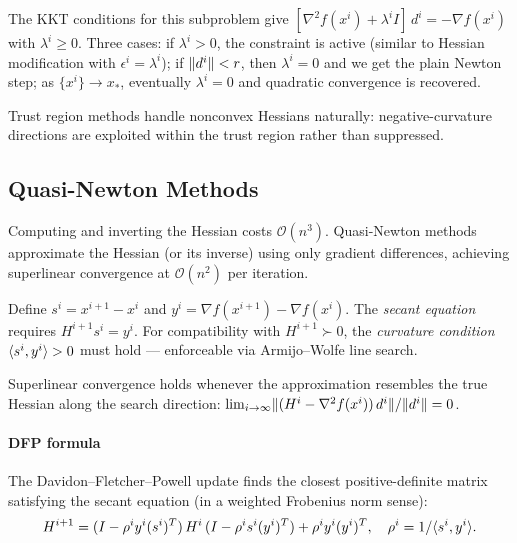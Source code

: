 The KKT conditions for this subproblem give $[\nabla^2 f(x^i) + \lambda^i I]\, d^i = -\nabla f(x^i)$ with $\lambda^i \geq 0$.
Three cases: if $\lambda^i > 0$, the constraint is active (similar to Hessian modification with $\epsilon^i = \lambda^i$); if $\lVert d^i\rVert < r$, then $\lambda^i = 0$ and we get the plain Newton step; as $\{x^i\} \to x_*$, eventually $\lambda^i = 0$ and quadratic convergence is recovered.

Trust region methods handle nonconvex Hessians naturally: negative-curvature directions are exploited within the trust region rather than suppressed.


\subsection{Quasi-Newton Methods}\label{ssec:quasi-newton}

Computing and inverting the Hessian costs $\mathcal{O}(n^3)$.
Quasi-Newton methods approximate the Hessian (or its inverse) using only gradient differences, achieving superlinear convergence at $\mathcal{O}(n^2)$ per iteration.

\begin{defn}\label{def:secant}
	Define $s^i = x^{i+1} - x^i$ and $y^i = \nabla f(x^{i+1}) - \nabla f(x^i)$.
	The \textit{secant equation} requires $H^{i+1} s^i = y^i$.
	For compatibility with $H^{i+1} \succ 0$, the \textit{curvature condition} $\langle s^i, y^i\rangle > 0$ must hold --- enforceable via Armijo--Wolfe line search.
\end{defn}

Superlinear convergence holds whenever the approximation resembles the true Hessian along the search direction: $\lim_{i \to \infty} \lVert(H^i - \nabla^2 f(x^i))\, d^i\rVert / \lVert d^i\rVert = 0$.

\paragraph{DFP formula}

The Davidon--Fletcher--Powell update finds the closest positive-definite matrix satisfying the secant equation (in a weighted Frobenius norm sense):
\begin{equation}\label{eq:dfp-update}
	H^{i+1} = (I - \rho^i y^i (s^i)^T)\, H^i\, (I - \rho^i s^i (y^i)^T) + \rho^i y^i (y^i)^T,
	\quad \rho^i = 1/\langle s^i, y^i\rangle.
\end{equation}

